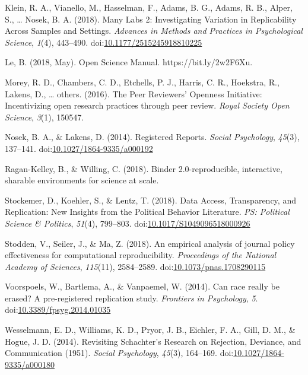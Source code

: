 \documentclass[,jou, a4paper,floatsintext]{apa6}
\begin{document}
\leavevmode\hypertarget{ref-klein_many_2018}{}%
Klein, R. A., Vianello, M., Hasselman, F., Adams, B. G., Adams, R. B., Alper, S., \ldots{} Nosek, B. A. (2018). Many Labs 2: Investigating Variation in Replicability Across Samples and Settings. \emph{Advances in Methods and Practices in Psychological Science}, \emph{1}(4), 443--490. doi:\href{https://doi.org/10.1177/2515245918810225}{10.1177/2515245918810225}

\leavevmode\hypertarget{ref-le_open_2018}{}%
Le, B. (2018, May). Open Science Manual. https://bit.ly/2w2F6Xu.

\leavevmode\hypertarget{ref-morey_peer_2016}{}%
Morey, R. D., Chambers, C. D., Etchells, P. J., Harris, C. R., Hoekstra, R., Lakens, D., \ldots{} others. (2016). The Peer Reviewers' Openness Initiative: Incentivizing open research practices through peer review. \emph{Royal Society Open Science}, \emph{3}(1), 150547.

\leavevmode\hypertarget{ref-nosek_registered_2014}{}%
Nosek, B. A., \& Lakens, D. (2014). Registered Reports. \emph{Social Psychology}, \emph{45}(3), 137--141. doi:\href{https://doi.org/10.1027/1864-9335/a000192}{10.1027/1864-9335/a000192}

\leavevmode\hypertarget{ref-ragan2018binder}{}%
Ragan-Kelley, B., \& Willing, C. (2018). Binder 2.0-reproducible, interactive, sharable environments for science at scale.

\leavevmode\hypertarget{ref-stockemer_data_2018}{}%
Stockemer, D., Koehler, S., \& Lentz, T. (2018). Data Access, Transparency, and Replication: New Insights from the Political Behavior Literature. \emph{PS: Political Science \& Politics}, \emph{51}(4), 799--803. doi:\href{https://doi.org/10.1017/S1049096518000926}{10.1017/S1049096518000926}

\leavevmode\hypertarget{ref-stodden_empirical_2018}{}%
Stodden, V., Seiler, J., \& Ma, Z. (2018). An empirical analysis of journal policy effectiveness for computational reproducibility. \emph{Proceedings of the National Academy of Sciences}, \emph{115}(11), 2584--2589. doi:\href{https://doi.org/10.1073/pnas.1708290115}{10.1073/pnas.1708290115}

\leavevmode\hypertarget{ref-voorspoels_can_2014}{}%
Voorspoels, W., Bartlema, A., \& Vanpaemel, W. (2014). Can race really be erased? A pre-registered replication study. \emph{Frontiers in Psychology}, \emph{5}. doi:\href{https://doi.org/10.3389/fpsyg.2014.01035}{10.3389/fpsyg.2014.01035}

\leavevmode\hypertarget{ref-wesselmann_revisiting_2014}{}%
Wesselmann, E. D., Williams, K. D., Pryor, J. B., Eichler, F. A., Gill, D. M., \& Hogue, J. D. (2014). Revisiting Schachter's Research on Rejection, Deviance, and Communication (1951). \emph{Social Psychology}, \emph{45}(3), 164--169. doi:\href{https://doi.org/10.1027/1864-9335/a000180}{10.1027/1864-9335/a000180}
\end{document}
